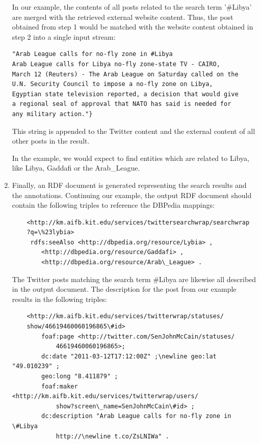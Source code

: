 \documentclass{llncs}
\begin{document}
\begin{enumerate}
In our example, the contents of all posts related to the search term '\#Libya'
are merged with the retrieved external website content. Thus, the post obtained from
step 1 would be matched with the website content obtained in step 2 into a
single input stream:
\begin{verbatim}"Arab League calls for no-fly zone in #Libya
Arab League calls for Libya no-fly zone-state TV - CAIRO, 
March 12 (Reuters) - The Arab League on Saturday called on the 
U.N. Security Council to impose a no-fly zone on Libya, 
Egyptian state television reported, a decision that would give
a regional seal of approval that NATO has said is needed for 
any military action."}
\end{verbatim}
This string is appended to the Twitter content and the external content of all other posts in the result.

In the example, we would expect to find entities which are related to Libya,
like Libya, Gaddafi or the Arab\_League.

	\item	Finally, an RDF document is generated representing the search results and
	the annotations. Continuing our example, the output RDF document should contain the following
	triples to reference the DBPedia mappings:
	\begin{verbatim}
	<http://km.aifb.kit.edu/services/twittersearchwrap/searchwrap
	?q=\%23lybia>
     rdfs:seeAlso <http://dbpedia.org/resource/Lybia> ,
        <http://dbpedia.org/resource/Gaddafi> ,
        <http://dbpedia.org/resource/Arab\_League> .
  \end{verbatim}
	The Twitter posts matching the search term \#Libya are likewise all described
	in the output document. The description for the post from our example 
	results in the following triples:
	\begin{verbatim}
	<http://km.aifb.kit.edu/services/twitterwrap/statuses/
	show/46619460060196865\#id> 
		foaf:page <http://twitter.com/SenJohnMcCain/statuses/
			46619460060196865>;
		dc:date "2011-03-12T17:12:00Z" ;\newline geo:lat "49.010239" ;
		geo:long "8.411879" ;
		foaf:maker <http://km.aifb.kit.edu/services/twitterwrap/users/
			show?screen\_name=SenJohnMcCain\#id> ;
		dc:description "Arab League calls for no-fly zone in \#Libya 
			http://\newline t.co/ZsLNIWa" . 
	\end{verbatim}
     
\end{enumerate}
\end{document}
